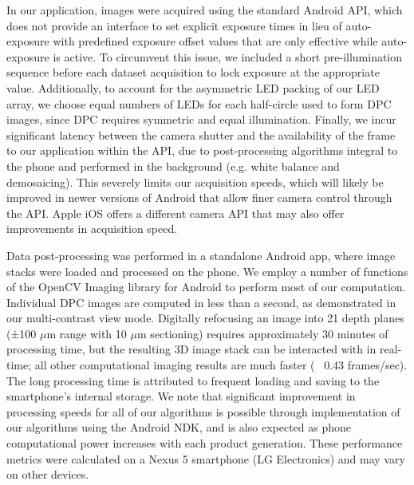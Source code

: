In our application, images were acquired using the standard Android API, which does not provide an interface to set explicit exposure times in lieu of auto-exposure with predefined exposure offset values that are only effective while auto-exposure is active. To circumvent this issue, we included a short pre-illumination sequence before each dataset acquisition to lock exposure at the appropriate value. Additionally, to account for the asymmetric LED packing of our LED array, we choose equal numbers of LEDs for each half-circle used to form DPC images, since DPC requires symmetric and equal illumination. Finally, we incur significant latency between the camera shutter and the availability of the frame to our application within the API, due to post-processing algorithms integral to the phone and performed in the background (e.g. white balance and demosaicing). This severely limits our acquisition speeds, which will likely be improved in newer versions of Android that allow finer camera control through the API. Apple iOS offers a different camera API that may also offer improvements in acquisition speed.

Data post-processing was performed in a standalone Android app, where image stacks were loaded and processed on the phone. We employ a number of functions of the OpenCV Imaging library for Android to perform most of our computation. Individual DPC images are computed in less than a second, as demonstrated in our multi-contrast view mode. Digitally refocusing an image into 21 depth planes (±100 $\mu$m range with 10 $\mu$m sectioning) requires approximately 30 minutes of processing time, but the resulting 3D image stack can be interacted with in real-time; all other computational imaging results are much faster (~ 0.43 frames/sec). The long processing time is attributed to frequent loading and saving to the smartphone’s internal storage. We note that significant improvement in processing speeds for all of our algorithms is possible through implementation of our algorithms using the Android NDK, and is also expected as phone computational power increases with each product generation. These performance metrics were calculated on a Nexus 5 smartphone (LG Electronics) and may vary on other devices.



